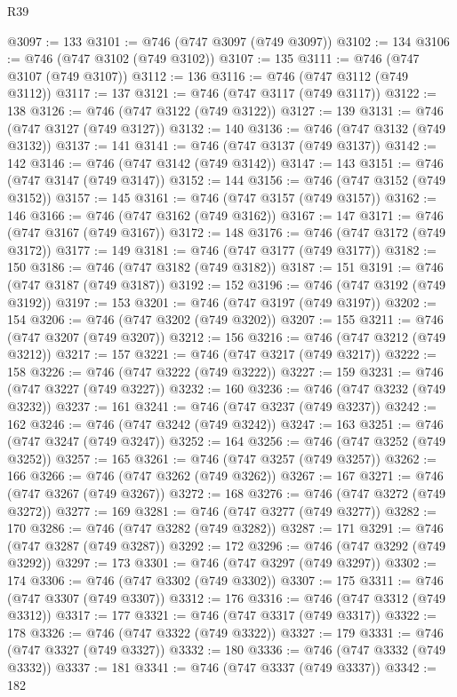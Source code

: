 \begin{lexlean}{R39}
\begin{coremodule}
@3097 := 133
@3101 := @746 (@747 @3097 (@749 @3097))
@3102 := 134
@3106 := @746 (@747 @3102 (@749 @3102))
@3107 := 135
@3111 := @746 (@747 @3107 (@749 @3107))
@3112 := 136
@3116 := @746 (@747 @3112 (@749 @3112))
@3117 := 137
@3121 := @746 (@747 @3117 (@749 @3117))
@3122 := 138
@3126 := @746 (@747 @3122 (@749 @3122))
@3127 := 139
@3131 := @746 (@747 @3127 (@749 @3127))
@3132 := 140
@3136 := @746 (@747 @3132 (@749 @3132))
@3137 := 141
@3141 := @746 (@747 @3137 (@749 @3137))
@3142 := 142
@3146 := @746 (@747 @3142 (@749 @3142))
@3147 := 143
@3151 := @746 (@747 @3147 (@749 @3147))
@3152 := 144
@3156 := @746 (@747 @3152 (@749 @3152))
@3157 := 145
@3161 := @746 (@747 @3157 (@749 @3157))
@3162 := 146
@3166 := @746 (@747 @3162 (@749 @3162))
@3167 := 147
@3171 := @746 (@747 @3167 (@749 @3167))
@3172 := 148
@3176 := @746 (@747 @3172 (@749 @3172))
@3177 := 149
@3181 := @746 (@747 @3177 (@749 @3177))
@3182 := 150
@3186 := @746 (@747 @3182 (@749 @3182))
@3187 := 151
@3191 := @746 (@747 @3187 (@749 @3187))
@3192 := 152
@3196 := @746 (@747 @3192 (@749 @3192))
@3197 := 153
@3201 := @746 (@747 @3197 (@749 @3197))
@3202 := 154
@3206 := @746 (@747 @3202 (@749 @3202))
@3207 := 155
@3211 := @746 (@747 @3207 (@749 @3207))
@3212 := 156
@3216 := @746 (@747 @3212 (@749 @3212))
@3217 := 157
@3221 := @746 (@747 @3217 (@749 @3217))
@3222 := 158
@3226 := @746 (@747 @3222 (@749 @3222))
@3227 := 159
@3231 := @746 (@747 @3227 (@749 @3227))
@3232 := 160
@3236 := @746 (@747 @3232 (@749 @3232))
@3237 := 161
@3241 := @746 (@747 @3237 (@749 @3237))
@3242 := 162
@3246 := @746 (@747 @3242 (@749 @3242))
@3247 := 163
@3251 := @746 (@747 @3247 (@749 @3247))
@3252 := 164
@3256 := @746 (@747 @3252 (@749 @3252))
@3257 := 165
@3261 := @746 (@747 @3257 (@749 @3257))
@3262 := 166
@3266 := @746 (@747 @3262 (@749 @3262))
@3267 := 167
@3271 := @746 (@747 @3267 (@749 @3267))
@3272 := 168
@3276 := @746 (@747 @3272 (@749 @3272))
@3277 := 169
@3281 := @746 (@747 @3277 (@749 @3277))
@3282 := 170
@3286 := @746 (@747 @3282 (@749 @3282))
@3287 := 171
@3291 := @746 (@747 @3287 (@749 @3287))
@3292 := 172
@3296 := @746 (@747 @3292 (@749 @3292))
@3297 := 173
@3301 := @746 (@747 @3297 (@749 @3297))
@3302 := 174
@3306 := @746 (@747 @3302 (@749 @3302))
@3307 := 175
@3311 := @746 (@747 @3307 (@749 @3307))
@3312 := 176
@3316 := @746 (@747 @3312 (@749 @3312))
@3317 := 177
@3321 := @746 (@747 @3317 (@749 @3317))
@3322 := 178
@3326 := @746 (@747 @3322 (@749 @3322))
@3327 := 179
@3331 := @746 (@747 @3327 (@749 @3327))
@3332 := 180
@3336 := @746 (@747 @3332 (@749 @3332))
@3337 := 181
@3341 := @746 (@747 @3337 (@749 @3337))
@3342 := 182

\end{coremodule}
\end{lexlean}
